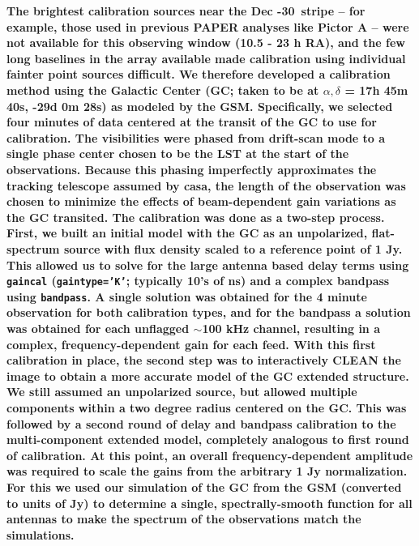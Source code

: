 \documentclass[twocolumn, trackchanges]{aastex61}
\newcommand{\casa}{{\sc casa}}
\newcommand{\edited}[1]{{\bf \color{red} #1}}
\begin{document}
\edited{The brightest calibration sources near the Dec -30\arcdeg\ stripe -- for example, those used in previous PAPER analyses like Pictor A \citep{jacobs13b} -- were not available for this observing window (10.5 - 23 h RA), and the few long baselines in the array available made calibration using individual fainter point sources difficult.  We therefore developed a calibration method using the Galactic Center (GC; taken to be at $\alpha, \delta$ = 17h 45m 40s, -29d 0m 28s) as modeled by the GSM. Specifically, we selected four minutes of data centered at the transit of the GC to use for calibration.   The visibilities were phased from drift-scan mode to a single phase center chosen to be the LST at the start of the observations.  Because this phasing imperfectly approximates the tracking telescope assumed by \casa, the length of the observation was chosen to minimize the effects of beam-dependent gain variations as the GC transited.  The calibration was done as a two-step process.  First, we built an initial model with the GC as an unpolarized, flat-spectrum source with flux density scaled to a reference point of 1 Jy.  This allowed us to solve for the large antenna based delay terms using {\tt gaincal} ({\tt gaintype='K'}; typically 10's of ns) and a complex bandpass using {\tt bandpass}.  A single solution was obtained for the 4 minute observation for both calibration types, and for the bandpass a solution was obtained for each unflagged $\sim$100 kHz channel, resulting in a complex, frequency-dependent gain for each feed.	With this first calibration in place, the second step was to interactively CLEAN the image to obtain a more accurate model of the GC extended structure.  We still assumed an unpolarized source, but allowed multiple components within a two degree radius centered on the GC.  This was followed by a second round of delay and bandpass calibration to the multi-component extended model, completely analogous to first round of calibration.  At this point, an overall frequency-dependent amplitude was required to scale the gains from the arbitrary 1 Jy normalization.  For this we used our simulation of the GC from the GSM (converted to units of Jy) to determine a single, spectrally-smooth function for all antennas to make the spectrum of the observations match the simulations.

}
\end{document}
